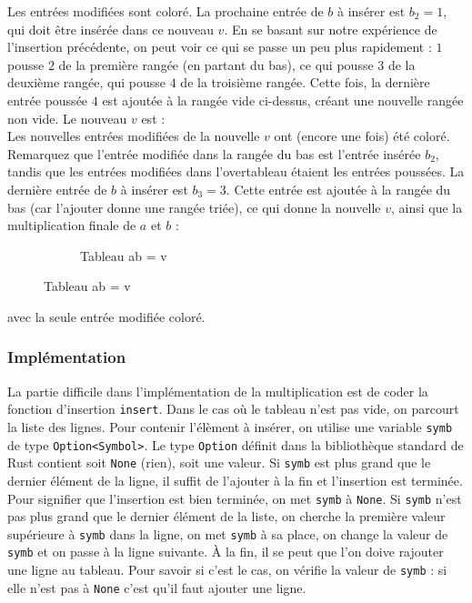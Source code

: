 Les entrées modifiées sont coloré. La prochaine entrée de $b$ à insérer est $b_2 = 1$, qui doit être insérée dans ce nouveau $v$. 
En se basant sur notre expérience de l'insertion précédente, on peut voir ce qui se passe un peu plus rapidement : $1$ pousse $2$ de la première rangée (en partant du bas), ce qui pousse $3$ de la deuxième rangée, qui pousse $4$ de la troisième rangée. 
Cette fois, la dernière entrée poussée $4$ est ajoutée à la rangée vide ci-dessus, créant une nouvelle rangée non vide. Le nouveau $v$ est : \\
Les nouvelles entrées modifiées de la nouvelle $v$ ont (encore une fois) été coloré. 
Remarquez que l'entrée modifiée dans la rangée du bas est l'entrée insérée $b_2$, tandis que les entrées modifiées dans l'overtableau étaient les entrées poussées.
La dernière entrée de $b$ à insérer est $b_3 = 3$. 
Cette entrée est ajoutée à la rangée du bas (car l'ajouter donne une rangée triée), ce qui donne la nouvelle $v$, ainsi que la multiplication finale de $a$ et $b$ : 
\begin{figure}[!ht]
	\centering
	\begin{subfigure}[b]{0.4\linewidth}
		\centering
		\caption{Tableau ab = v}
		\label{fig:tab13}
	\end{subfigure}
	\label{fig:tabs8}
\end{figure}
avec la seule entrée modifiée coloré.

\subsubsection{Implémentation}
La partie difficile dans l'implémentation de la multiplication est de coder la fonction d'insertion \texttt{insert}. Dans le cas où le tableau n'est pas vide, on parcourt la liste des lignes. Pour contenir l'élèment à insérer, on utilise une variable \texttt{symb} de type \texttt{Option<Symbol>}. Le type \texttt{Option} définit dans la bibliothèque standard de Rust contient soit \texttt{None} (rien), soit une valeur.  Si \texttt{symb} est plus grand que le dernier élément de la ligne, il suffit de l'ajouter à la fin et l'insertion est terminée. Pour signifier que l'insertion est bien terminée, on met \texttt{symb} à \texttt{None}. Si \texttt{symb} n'est pas  plus grand que le dernier élément de la liste, on cherche la première valeur supérieure à \texttt{symb} dans la ligne, on met \texttt{symb} à sa place, on change la valeur de \texttt{symb} et on passe à la ligne suivante. À la fin, il se peut que l'on doive rajouter une ligne au tableau. Pour savoir si c'est le cas, on vérifie la valeur de \texttt{symb} : si elle n'est pas  à \texttt{None} c'est qu'il faut ajouter une ligne.

